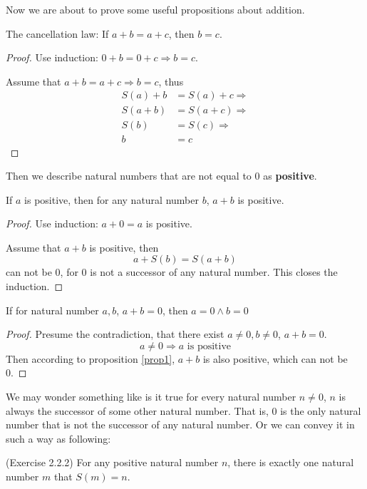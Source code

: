 Now we are about to prove some useful propositions about addition.

\begin{prop}
The cancellation law: If $a+b=a+c$, then $b=c$.
\end{prop}
\begin{proof}
Use induction: $0+b=0+c \Longrightarrow b=c$.

Assume that $a+b=a+c \Longrightarrow b=c$, thus 
\begin{align*}
S(a)+b &= S(a)+c \Longrightarrow \\
S(a+b) &= S(a+c) \Longrightarrow \\
S(b) &= S(c) \Longrightarrow \\
b &= c
\end{align*}
\end{proof}

Then we describe natural numbers that are not equal to 0 as \textbf{positive}. 

\begin{prop}
If $a$ is positive, then for any natural number $b$, $a+b$ is positive. \label{prop1}
\end{prop}
\begin{proof}
Use induction: $a+0=a$ is positive.

Assume that $a+b$ is positive, then 
\[
a+S(b) = S(a+b)
\]
can not be 0, for 0 is not a successor of any natural number. This closes the induction. \qedhere
\end{proof}

\begin{coro}
If for natural number $a,b$, $a+b=0$, then $a=0 \wedge b=0$ \label{coro1}
\end{coro}
\begin{proof}
Presume the contradiction, that there exist $a \neq 0, b \neq 0$, $a+b=0$. 
\[
a \neq 0 \Longrightarrow a \text{ is positive}
\]
Then according to proposition \ref{prop1}, $a+b$ is also positive, which can not be 0. \qedhere
\end{proof}

We may wonder something like is it true for every natural number $n \neq 0$, $n$ is always the 
successor of some other natural number. That is, 0 is the only natural number that is not the successor 
of any natural number. Or we can convey it in such a way as following: 
\begin{prop}
(Exercise 2.2.2) \label{exercise2.2.2}
For any positive natural number $n$, there is exactly one natural number $m$ that $S(m) = n$. 
\label{prop5}
\end{prop} 

